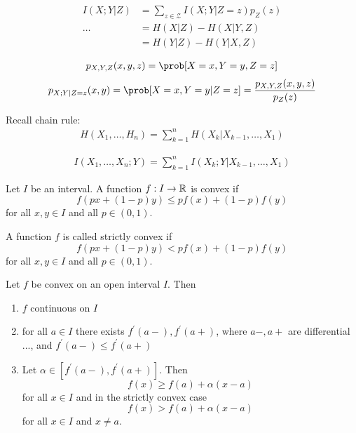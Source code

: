 \documentclass[mfit.tex]{subfiles}
\begin{document}
\begin{defi*}
  \begin{align*}
    I(X;Y|Z) &= \sum_{z \in \mathcal{Z}} I(X;Y|Z=z) p_Z(z) \\
    \dots &= H(X|Z) - H(X|Y,Z) \\
    &= H(Y|Z) - H(Y|X,Z)
  \end{align*}
\end{defi*}

\begin{rem}
  \begin{align*}
    p_{X,Y,Z} (x,y,z) = \prob[X=x,Y=y,Z=z]
  \end{align*}
  \begin{align*}
    p_{X;Y|Z=z} (x,y) = \prob[X=x,Y=y|Z=z] = \frac{p_{X,Y,Z}(x,y,z)}{p_Z(z)}
  \end{align*}
\end{rem}

Recall chain rule:
\begin{align*}
  H(X_1,\dots,H_n) = \sum_{k=1}^n H(X_k | X_{k-1},\dots,X_1)
\end{align*}

\begin{lemma}
  \begin{align*}
    I(X_1,\dots,X_n;Y) = \sum_{k=1}^n I(X_k;Y|X_{k-1},\dots,X_1)
  \end{align*}
\end{lemma}

\begin{rem}
  Let $I$ be an interval. A function $f: I \to \mathbb{R}$ is convex if
  \[ f(px + (1-p) y) \leq p f(x) + (1-p) f(y) \]
  for all $x,y \in I$ and all $p \in (0,1)$.
  
  A function $f$ is called strictly convex if
  \[ f(px + (1-p) y) < p f(x) + (1-p) f(y) \]
  for all $x,y \in I$ and all $p \in (0,1)$.  
\end{rem}

\begin{rem}
  Let $f$ be convex on an open interval $I$. Then
  \begin{enumerate}
    \item $f$ continuous on $I$
    \item for all $a \in I$ there exists $f^\prime(a-),f^\prime(a+)$, where $a-,a+$ are differential ..., and $f^\prime(a-) \leq f^\prime(a+)$
    \item Let $\alpha \in [f^\prime(a-),f^\prime(a+)]$. Then
    \[ f(x) \geq f(a) + \alpha (x-a) \]
    for all $x \in I$ and in the strictly convex case
    \[ f(x) > f(a) + \alpha (x-a) \]
    for all $x \in I$ and $x \neq a$.
  \end{enumerate}
\end{rem}
\end{document}
